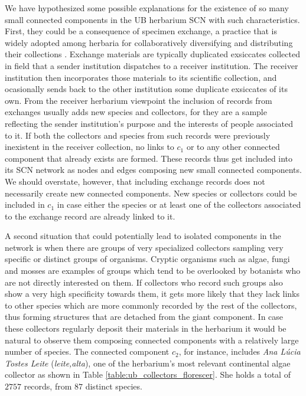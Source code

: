 We have hypothesized some possible explanations for the existence of so many small connected components in the UB herbarium SCN with such characteristics. First, they could be a consequence of specimen exchange, a practice that is widely adopted among herbaria for collaboratively diversifying and distributing their collections \cite{Groom2014}. Exchange materials are typically duplicated exsiccates collected in field that a sender institution dispatches to a receiver institution. The receiver institution then incorporates those materials to its scientific collection, and ocasionally sends back to the other institution some duplicate exsiccates of its own.
From the receiver herbarium viewpoint the inclusion of records from exchanges usually adds new species and collectors, for they are a sample reflecting the sender institution's purpose and the interests of people associated to it. If both the collectors and species from such records were previously inexistent in the receiver collection, no links to $c_1$ or to any other connected component that already exists are formed. These records thus get included into its SCN network as nodes and edges composing new small connected components. We should overstate, however, that including exchange records does not necessarily create new connected components. New species or collectors could be included in $c_1$ in case either the species or at least one of the collectors associated to the exchange record are already linked to it.

A second situation that could potentially lead to isolated components in the network is when there are groups of very specialized collectors sampling very specific or distinct groups of organisms. 
Cryptic organisms such as algae, fungi and mosses are examples of groups which tend to be overlooked by botanists who are not directly interested on them. 
If collectors who record such groups also show a very high specificity towards them, it gets more likely that they lack links to other species which are more commonly recorded by the rest of the collectors, thus forming structures that are detached from the giant component. 
In case these collectors regularly deposit their materials in the herbarium it would be natural to observe them composing connected components with a relatively large number of species.
The connected component $c_2$, for instance, includes \textit{Ana Lúcia Tostes Leite} (\textit{leite,alta}), one of the herbarium's most relevant continental algae collector as shown in Table \ref{table:ub_collectors_florescer}.
She holds a total of $2757$ records, from $87$ distinct species.



